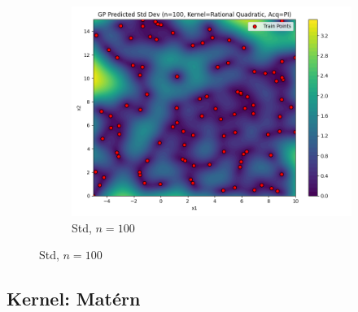 \documentclass[a4paper,12pt]{article}
\begin{document}
\begin{figure}[H]
\begin{subfigure}{0.3\textwidth}
    \includegraphics[width=\linewidth]{Task-02/images/gp_std_rational_quadratic_n100_PI.png}
    \caption{Std, $n=100$}
\end{subfigure}
\end{figure}

\subsection*{Kernel: Matérn}
\end{document}
